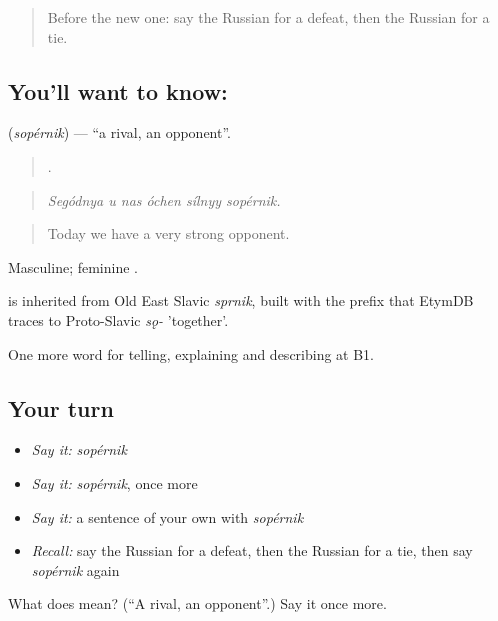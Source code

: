 \begin{quote}
Before the new one: say the Russian for a defeat, then the Russian for a tie.
\end{quote}

\subsection*{You'll want to know: }
\textbf{} (\emph{sopérnik}) — \textquotedblleft{}a rival, an opponent\textquotedblright{}.

\begin{quote}
     .
\end{quote}

\begin{quote}
\emph{Segódnya u nas óchen sílnyy sopérnik.}
\end{quote}

\begin{quote}
Today we have a very strong opponent.
\end{quote}

Masculine; feminine .

\begin{cousinweb}
\emph{} is inherited from Old East Slavic \emph{sprnik}, built with the prefix that EtymDB traces to Proto-Slavic \emph{sǫ-} 'together'.
\end{cousinweb}

\begin{grammarlens}[title={What you've built}]
One more word for telling, explaining and describing at B1.
\end{grammarlens}

\subsection*{Your turn}
\begin{itemize}
\raggedright
  \item \emph{Say it:} \emph{sopérnik}
  \item \emph{Say it:} \emph{sopérnik}, once more
  \item \emph{Say it:} a sentence of your own with \emph{sopérnik}
  \item \emph{Recall:} say the Russian for a defeat, then the Russian for a tie, then say \emph{sopérnik} again
\end{itemize}

\begin{tcolorbox}[breakable,colback=teal!4,colframe=teal!35!black,title={Before you move on}]
What does  mean? (\textquotedblleft{}A rival, an opponent\textquotedblright{}.) Say it once more.
\end{tcolorbox}
